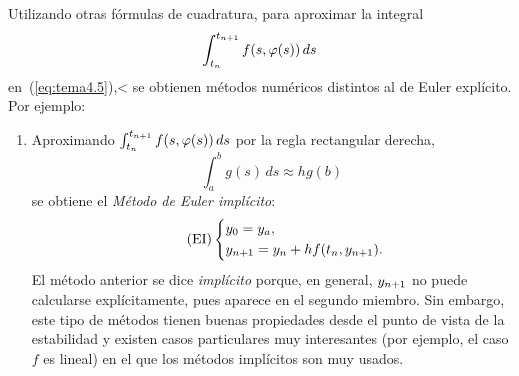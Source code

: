 Utilizando otras fórmulas de cuadratura, para aproximar la integral
$$\int_{t_n}^{t_{n+1}} f(s,\varphi(s))\, ds$$ en~(\ref{eq:tema4.5}),<
se obtienen métodos numéricos
distintos al de Euler explícito. Por ejemplo:
\begin{enumerate}
\item Aproximando $\int_{t_n}^{t_{n+1}} f(s,\varphi(s))\, ds$ por la regla
  rectangular derecha,
  \begin{equation*}
    \int_a^b g(s)\,ds \approx hg(b)
  \end{equation*}
  se obtiene el \textit{Método de Euler implícito}:
  \begin{equation}
    \label{eq:euler-implicito}
    \tag{EI}
    \left\{
      \begin{aligned}
        &y_0={y_a},\\ &{y_{n+1}} = {y_n} + h f({t_n},{y_{n+1}}).
      \end{aligned}
    \right.
  \end{equation}
  El método anterior se dice \textit{implícito} porque, en general,
  ${y_{n+1}}$ no puede calcularse explícitamente, pues aparece en el
  segundo miembro. Sin embargo, este tipo de métodos tienen buenas
  propiedades desde el punto de vista de la estabilidad y existen
  casos particulares muy interesantes (por ejemplo, el caso $f$ es
  lineal) en el que los métodos implícitos son muy usados.


\end{enumerate}
